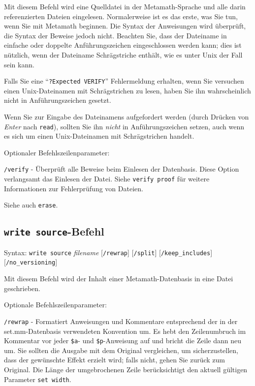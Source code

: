 Mit diesem Befehl wird eine Quelldatei in der Metamath-Sprache und alle darin referenzierten Dateien eingelesen.  Normalerweise ist es das erste, was Sie tun, wenn Sie mit Metamath beginnen. Die Syntax der Anweisungen wird überprüft, die Syntax der Beweise jedoch nicht. Beachten Sie, dass der Dateiname in einfache oder doppelte Anführungszeichen eingeschlossen werden kann; dies ist nützlich, wenn der Dateiname Schrägstriche enthält, wie es unter Unix der Fall sein kann.

Falls Sie eine "`\texttt{?Expected VERIFY}"' Fehlermeldung erhalten, wenn Sie versuchen einen Unix-Dateinamen mit Schrägstrichen zu lesen, haben Sie ihn wahrscheinlich nicht in Anführungszeichen gesetzt.

Wenn Sie zur Eingabe des Dateinamens aufgefordert werden (durch Drücken von {\em Enter} nach \texttt{read}), sollten Sie ihn {\em nicht} in Anführungszeichen setzen, auch wenn es sich um einen Unix-Dateinamen mit Schrägstrichen handelt.

Optionaler Befehlszeilenparameter:

    \texttt{/verify} - Überprüft alle Beweise beim Einlesen der Datenbasis.  Diese Option verlangsamt das Einlesen der Datei.  Siehe \texttt{verify proof} für weitere Informationen zur Fehlerprüfung von Dateien.

Siehe auch \texttt{erase}.


\subsection{\texttt{write source}-Befehl}

Syntax:  \texttt{write source} {\em filename}
[\texttt{/rewrap}]
[\texttt{/split}]
[\texttt{/keep\_includes}] {\\}
[\texttt{/no\_versioning}]

Mit diesem Befehl wird der Inhalt einer Metamath-Datenbasis in eine Datei geschrieben.

Optionale Befehlszeilenparameter:

\texttt{/rewrap} - Formatiert Anweisungen und Kommentare entsprechend der in der set.mm-Datenbasis verwendeten Konvention um. Es hebt den Zeilenumbruch im Kommentar vor jeder \texttt{\$a}- und \texttt{\$p}-Anweisung auf und bricht die Zeile dann neu um.  Sie sollten die Ausgabe mit dem Original vergleichen, um sicherzustellen, dass der gewünschte Effekt erzielt wird; falls nicht, gehen Sie zurück zum Original.  Die Länge der umgebrochenen Zeile berücksichtigt den aktuell gültigen Parameter \texttt{set width}.

